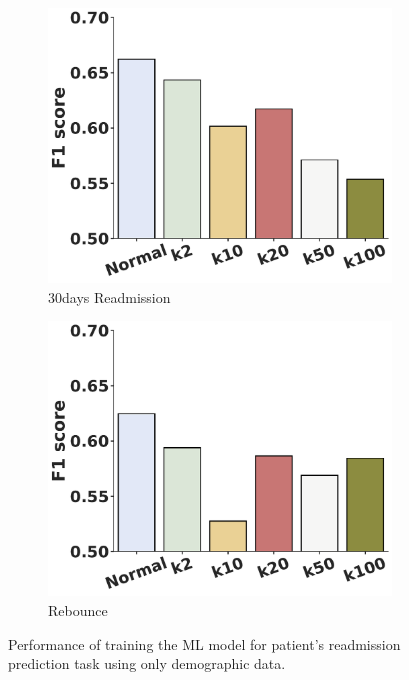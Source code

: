 \documentclass{bioinfo}
\begin{document}
\begin{figure}[!tpb]
\begin{subfigure}[b]{.45\linewidth}
\centering
\includegraphics[width=\linewidth]{readmission_pred_30days.pdf}
\caption{30days Readmission}
\label{sfig:30daysReadmission}
\end{subfigure}%
\begin{subfigure}[b]{.45\linewidth}
\centering
\includegraphics[width=\linewidth]{readmission_pred_rebounce.pdf}
\caption{Rebounce}
\label{sfig:Rebounce}
\end{subfigure}%


\caption{Performance of training the ML model for patient's readmission prediction task using only demographic data.}
\label{readmission}
\end{figure}
\end{document}

